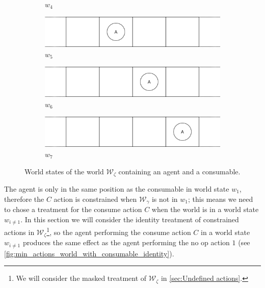 \begin{figure}[H]
\begin{subfigure}{0.48\textwidth}
    \caption{$w_{4}$}
    \label{fig:w4}
  \end{subfigure}%
  \hfill
  \begin{subfigure}{0.48\textwidth}
    \centering
    \includegraphics[width=\textwidth]{5BeyondSBDRL/GlobalAlgebras/Images/Consumable_world_states/w5.png}
    \caption{$w_{5}$}
    \label{fig:w5}
  \end{subfigure}%
  \vspace{0.5cm}
  \begin{subfigure}{0.48\textwidth}
    \centering
    \includegraphics[width=\textwidth]{5BeyondSBDRL/GlobalAlgebras/Images/Consumable_world_states/w6.png}
    \caption{$w_{6}$}
    \label{fig:w6}
  \end{subfigure}%
  \hfill
  \begin{subfigure}{0.48\textwidth}
    \centering
    \includegraphics[width=\textwidth]{5BeyondSBDRL/GlobalAlgebras/Images/Consumable_world_states/w7.png}
    \caption{$w_{7}$}
    \label{fig:w7}
  \end{subfigure}%
  
  \caption{
  World states of the world $\mathscr{W}_{\zeta}$ containing an agent and a consumable.
  }
  \label{fig:4x1_consumable_world_states}
\end{figure}

The agent is only in the same position as the consumable in world state $w_{1}$, therefore the $C$ action is constrained when $\mathscr{W}_{\gamma}$ is not in $w_{1}$; this means we need to chose a treatment for the consume action $C$ when the world is in a world state $w_{i \neq 1}$.
In this section we will consider the identity treatment of constrained actions in $\mathscr{W}_{\zeta}$\footnote{
We will consider the masked treatment of $\mathscr{W}_{\zeta}$ in \cref{sec:Undefined actions}.
}, so the agent performing the consume action $C$ in a world state $w_{i \neq 1}$ produces the same effect as the agent performing the no op action $1$ (see \cref{fig:min_actions_world_with_consumable_identity}).

